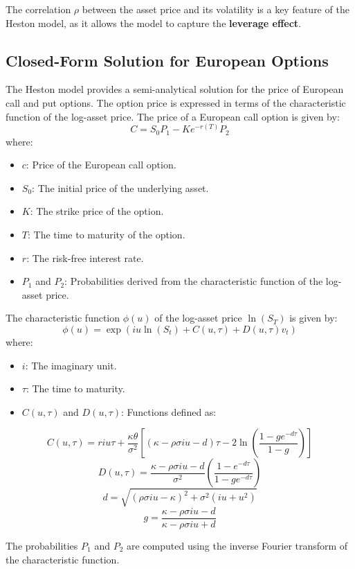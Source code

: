 \documentclass[11pt, oneside, a4paper, titlepage]{report}
\begin{document}
The correlation \( \rho \) between the asset price and its volatility is a key feature of the Heston model, as it allows the model to capture the \textbf{leverage effect}.

\subsection{Closed-Form Solution for European Options}

The Heston model provides a semi-analytical solution for the price of European call and put options. The option price is expressed in terms of the characteristic function of the log-asset price. The price of a European call option is given by:
\[
C = S_0 P_1 - K e^{-r(T)} P_2
\]
where:
\begin{itemize}
    \item \( c \): Price of the European call option.
    \item \( S_0 \): The initial price of the underlying asset.
    \item \( K \): The strike price of the option.
    \item \( T \): The time to maturity of the option.
    \item \( r \): The risk-free interest rate.
    \item \( P_1 \) and \( P_2 \): Probabilities derived from the characteristic function of the log-asset price.
\end{itemize}

The characteristic function \( \phi(u) \) of the log-asset price \( \ln(S_T) \) is given by:
\[
\phi(u) = \exp\left( i u \ln(S_t) + C(u, \tau) + D(u, \tau) v_t \right)
\]
where:
\begin{itemize}
    \item \( i \): The imaginary unit.
    \item \( \tau \): The time to maturity.
    \item \( C(u, \tau) \) and \( D(u, \tau) \): Functions defined as:
\end{itemize}
\[
C(u, \tau) = r i u \tau + \frac{\kappa \theta}{\sigma^2} \left[ (\kappa - \rho \sigma i u - d) \tau - 2 \ln\left( \frac{1 - g e^{-d \tau}}{1 - g} \right) \right]
\]
\[
D(u, \tau) = \frac{\kappa - \rho \sigma i u - d}{\sigma^2} \left( \frac{1 - e^{-d \tau}}{1 - g e^{-d \tau}} \right)
\]
\[
d = \sqrt{(\rho \sigma i u - \kappa)^2 + \sigma^2 (i u + u^2)}
\]
\[
g = \frac{\kappa - \rho \sigma i u - d}{\kappa - \rho \sigma i u + d}
\]

The probabilities \( P_1 \) and \( P_2 \) are computed using the inverse Fourier transform of the characteristic function.
\end{document}
